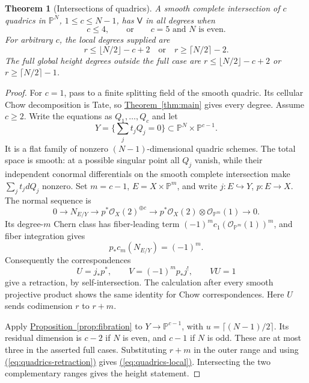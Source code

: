 \documentclass[11pt,a4paper]{article}
\newtheorem{theorem}{Theorem}[section]
\theoremstyle{definition}
\theoremstyle{remark}\newtheorem{remark}[theorem]{Remark}
\numberwithin{equation}{section}
\newcommand{\PP}{\mathbb P}\newcommand{\LL}{\mathbb L}
\newcommand{\thmref}[1]{\hyperref[#1]{\textcolor{resultlink}{Theorem~\ref*{#1}}}}
\newcommand{\propref}[1]{\hyperref[#1]{\textcolor{resultlink}{Proposition~\ref*{#1}}}}
\renewcommand{\eqref}[1]{\hyperref[#1]{\textcolor{equationlink}{(\ref*{#1})}}}
\begin{document}
\begin{theorem}[Intersections of quadrics]\label{thm:quadrics}
A smooth complete intersection of $c$ quadrics in $\PP^N$,
$1\leq c\leq N-1$, has $\mathsf V$ in all degrees when
\[
 c\leq4,\qquad\text{or}\qquad c=5\text{ and }N\text{ is even}.
\]
For arbitrary $c$, the local degrees supplied are
\begin{equation}\label{eq:quadrics-local}
 r\leq\lfloor N/2\rfloor-c+2
 \quad\text{or}\quad r\geq\lceil N/2\rceil-2.
\end{equation}
The full global height degrees outside the full case are
$r\leq\lfloor N/2\rfloor-c+2$ or
$r\geq\lceil N/2\rceil-1$.
\end{theorem}

\begin{proof}
For $c=1$, pass to a finite splitting field of the smooth quadric.
Its cellular Chow decomposition is Tate, so \thmref{thm:main}
gives every degree. Assume $c\geq2$. Write the equations as
$Q_1,\ldots,Q_c$ and let
\[
 Y=\{\textstyle\sum_jt_jQ_j=0\}\subset\PP^N\times\PP^{c-1}.
\]
It is a flat family of nonzero $(N-1)$-dimensional quadric
schemes. The total space is smooth: at a possible singular point
all $Q_j$ vanish, while their independent conormal differentials
on the smooth complete intersection make $\sum_jt_jdQ_j$
nonzero. Set $m=c-1$, $E=X\times\PP^m$, and write
$j:E\hookrightarrow Y$, $p:E\to X$. The normal sequence is
\[
 0\longrightarrow N_{E/Y}\longrightarrow
 p^*\mathcal O_X(2)^{\oplus c}\longrightarrow
 p^*\mathcal O_X(2)\otimes\mathcal O_{\PP^m}(1)
 \longrightarrow0.
\]
Its degree-$m$ Chern class has fiber-leading term
$(-1)^mc_1(\mathcal O_{\PP^m}(1))^m$, and fiber integration gives
\[
 p_*c_m(N_{E/Y})=(-1)^m.
\]
Consequently the correspondences
\begin{equation}\label{eq:quadrics-retraction}
 U=j_*p^*,\qquad V=(-1)^mp_*j^!,\qquad VU=1
\end{equation}
give a retraction, by self-intersection. The calculation after
every smooth projective product shows the same identity for
Chow correspondences. Here $U$ sends codimension $r$ to $r+m$.

Apply \propref{prop:fibration} to $Y\to\PP^{c-1}$, with
$u=\lceil(N-1)/2\rceil$. Its residual dimension is $c-2$ if
$N$ is even, and $c-1$ if $N$ is odd. These are at most three
in the asserted full cases. Substituting $r+m$ in the outer
range and using \eqref{eq:quadrics-retraction} gives
\eqref{eq:quadrics-local}. Intersecting the two complementary
ranges gives the height statement.
\end{proof}
\end{document}
